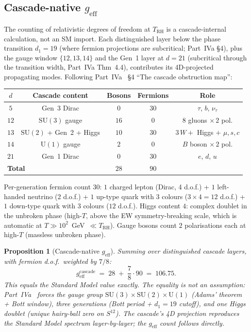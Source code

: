 \documentclass[12pt,a4paper]{article}
\newtheorem{proposition}[theorem]{Proposition}
\begin{document}
\subsection{Cascade-native \texorpdfstring{$g_{\mathrm{eff}}$}{g\_eff}}\label{subsec:g_eff}

The counting of relativistic degrees of freedom at $T_{\mathrm{RH}}$ is a
cascade-internal calculation, not an SM import. Each distinguished layer
below the phase transition $d_1 = 19$ (where fermion projections are
subcritical; Part~IVa \S4), plus the gauge window $\{12, 13, 14\}$ and
the Gen~1 layer at $d = 21$ (subcritical through the transition width,
Part~IVa Thm~4.4), contributes its 4D-projected propagating modes.
Following Part~IVa~\cite{part4a} \S4 ``The cascade obstruction map'':

\begin{center}
\renewcommand{\arraystretch}{1.25}
\begin{tabular}{ccccc}
\toprule
$d$ & Cascade content & Bosons & Fermions & Role \\
\midrule
$5$  & Gen~3 Dirac                         & $0$   & $30$ & $\tau$, $b$, $\nu_\tau$ \\
$12$ & $\mathrm{SU}(3)$ gauge              & $16$  & $0$  & $8$ gluons $\times\,2$ pol. \\
$13$ & $\mathrm{SU}(2)$ + Gen~2 + Higgs    & $10$  & $30$ & $3\,W + $ Higgs $+$ $\mu,s,c$ \\
$14$ & $\mathrm{U}(1)$ gauge               & $2$   & $0$  & $B$ boson $\times\,2$ pol. \\
$21$ & Gen~1 Dirac                         & $0$   & $30$ & $e$, $d$, $u$ \\
\midrule
\multicolumn{2}{l}{\textbf{Total}}          & $28$  & $90$ & \\
\bottomrule
\end{tabular}
\end{center}

Per-generation fermion count $30$: $1$ charged lepton (Dirac, 4 d.o.f.) +
$1$ left-handed neutrino (2 d.o.f.) + $1$ up-type quark with 3 colours
($3 \times 4 = 12$ d.o.f.) + $1$ down-type quark with 3 colours
($12$ d.o.f.). Higgs content $4$: complex doublet in the unbroken phase
(high-$T$, above the EW symmetry-breaking scale, which is automatic at
$T \gg 10^{2}$~GeV~$\ll T_{\mathrm{RH}}$). Gauge bosons count $2$
polarisations each at high-$T$ (massless unbroken phase).

\begin{proposition}[Cascade-native $g_{\mathrm{eff}}$]\label{prop:g_eff}
Summing over distinguished cascade layers, with fermion d.o.f.\ weighted by
$7/8$:
\[
g_{\mathrm{eff}}^{\mathrm{cascade}}
\;=\; 28 \;+\; \frac{7}{8}\cdot 90 \;=\; 106.75.
\]
This equals the Standard Model value exactly. The equality is not an
assumption: Part~IVa~\cite{part4a} forces the gauge group
$\mathrm{SU}(3)\times\mathrm{SU}(2)\times\mathrm{U}(1)$ (Adams' theorem +
Bott window), three generations (Bott period + $d_1 = 19$ cutoff), and
one Higgs doublet (unique hairy-ball zero on $S^{12}$). The cascade's
4D projection reproduces the Standard Model spectrum layer-by-layer; the
$g_{\mathrm{eff}}$ count follows directly.
\end{proposition}
\end{document}
